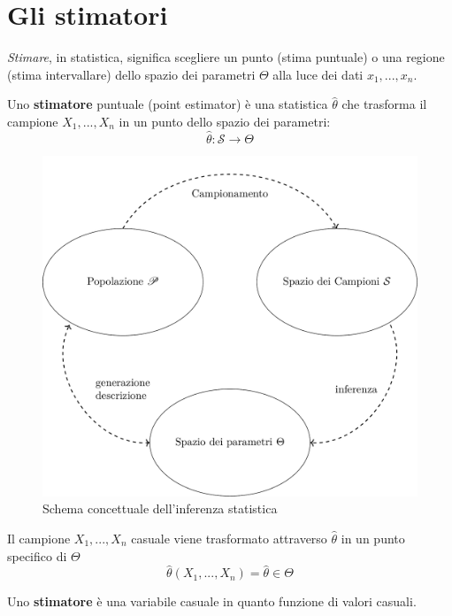 \documentclass[
  11pt,
]{book}
\theoremstyle{mytheoremstyle}
\theoremstyle{mydefstyle}
\begin{document}
\section{Gli stimatori}\label{gli-stimatori}

\emph{Stimare}, in statistica, significa scegliere un punto (stima puntuale) o una regione (stima intervallare) dello spazio dei parametri \(\Theta\) alla luce dei dati \(x_1,...,x_n\).

\begin{info}

Uno \textbf{stimatore} puntuale (point estimator) è una statistica \(\hat\theta\) che trasforma il campione \(X_1,...,X_n\) in un punto dello spazio dei parametri:
\[\hat\theta:\mathcal{S}\to\Theta\]

\end{info}

\begin{figure}[H]

{\centering \includegraphics[width=0.9\linewidth,]{img/inferenza1-1} 

}

\caption{Schema concettuale dell'inferenza statistica}\label{fig:fig-inferenza1}
\end{figure}

Il campione \(X_1,...,X_n\) casuale viene trasformato attraverso \(\hat\theta\) in un punto specifico di \(\Theta\)
\[\hat\theta(X_1,...,X_n)=\hat\theta\in\Theta\]

Uno \textbf{stimatore} è una variabile casuale in quanto funzione di valori casuali.
\end{document}
